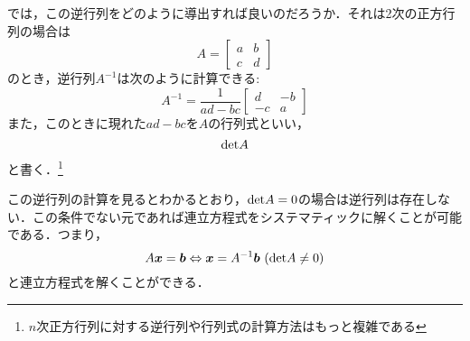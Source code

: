 \documentclass[a4paper,12pt,autodetect-engine,dvipdfmx]{jsarticle}
\theoremstyle{definition}
\begin{document}
では，この逆行列をどのように導出すれば良いのだろうか．それは2次の正方行列の場合は
\begin{equation*}
    A = \begin{bmatrix}
        a & b\\
        c & d
    \end{bmatrix}
\end{equation*}
のとき，逆行列$A^{-1}$は次のように計算できる:
\begin{equation*}
    A^{-1} = 
    \dfrac{1}{ad - bc}
    \begin{bmatrix}
        d & -b\\
        -c & a
    \end{bmatrix}
\end{equation*}
また，このときに現れた$ad - bc$を$A$の行列式といい，
$${\rm{det}} A$$
と書く．\footnote{$n$次正方行列に対する逆行列や行列式の計算方法はもっと複雑である}

この逆行列の計算を見るとわかるとおり，${\rm{det}}A = 0$の場合は逆行列は存在しない．この条件でない元であれば連立方程式をシステマティックに解くことが可能である．つまり，
\begin{equation*}
    A\bm{x} = \bm{b} \Leftrightarrow \bm{x} = A^{-1} \bm{b} \ ({\rm{det}} A \neq 0)
\end{equation*}
と連立方程式を解くことができる．
\end{document}
